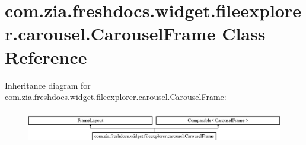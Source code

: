 \hypertarget{classcom_1_1zia_1_1freshdocs_1_1widget_1_1fileexplorer_1_1carousel_1_1_carousel_frame}{\section{com.\-zia.\-freshdocs.\-widget.\-fileexplorer.\-carousel.\-Carousel\-Frame Class Reference}
\label{classcom_1_1zia_1_1freshdocs_1_1widget_1_1fileexplorer_1_1carousel_1_1_carousel_frame}
}
Inheritance diagram for com.\-zia.\-freshdocs.\-widget.\-fileexplorer.\-carousel.\-Carousel\-Frame\-:\begin{figure}[H]
\begin{center}
\leavevmode
\includegraphics[height=1.493333cm]{classcom_1_1zia_1_1freshdocs_1_1widget_1_1fileexplorer_1_1carousel_1_1_carousel_frame}
\end{center}
\end{figure}
